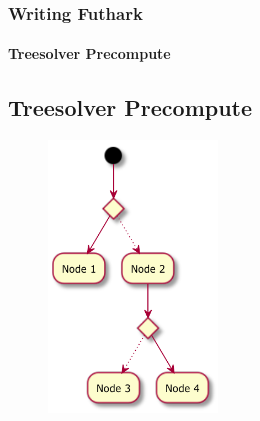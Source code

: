 \documentclass[12pt,t]{beamer}
\begin{document}
\begin{frame}
  \frametitle{Writing Futhark}
  \framesubtitle{Treesolver Precompute}
\subsection{Treesolver Precompute}

\begin{figure}
\centering
\includegraphics[width=0.4\textwidth]{tree_traverse}
\end{figure}

\end{frame}
\end{document}

